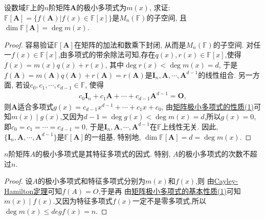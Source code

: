 \documentclass[../../main.tex]{subfiles}%
\begin{document}
\begin{proposition}\label{proposition:F[A]的维数等于A的极小多项式的次数}
设数域\(\mathbb{F}\)上的\(n\)阶矩阵\(\boldsymbol{A}\)的极小多项式为\(m(x)\), 求证: \(\mathbb{F}[\boldsymbol{A}] = \{f(\boldsymbol{A})|f(x)\in\mathbb{F}[x]\}\)是\(M_n(\mathbb{F})\)的子空间, 且\(\dim\mathbb{F}[\boldsymbol{A}] = \deg m(x)\).
\end{proposition}
\begin{proof}

容易验证\(\mathbb{F}[\boldsymbol{A}]\)在矩阵的加法和数乘下封闭, 从而是\(M_n(\mathbb{F})\)的子空间. 对任一\(f(x)\in\mathbb{F}[x]\),由多项式的带余除法可知,存在$q(x),r(x)\in \mathbb{F}[x]$,使得\(f(x) = m(x)q(x) + r(x)\), 其中\(\deg r(x)<\deg m(x) = d\), 于是\(f(\boldsymbol{A}) = m(\boldsymbol{A})q(\boldsymbol{A}) + r(\boldsymbol{A}) = r(\boldsymbol{A})\)是\(\boldsymbol{I}_n,\boldsymbol{A},\cdots,\boldsymbol{A}^{d - 1}\)的线性组合. 另一方面, 若设\(c_0,c_1,\cdots,c_{d - 1}\in\mathbb{F}\), 使得
\begin{align*}
c_0\boldsymbol{I}_n + c_1\boldsymbol{A}+\cdots + c_{d - 1}\boldsymbol{A}^{d - 1} = \boldsymbol{O},
\end{align*}
则\(\boldsymbol{A}\)适合多项式\(g(x) = c_{d - 1}x^{d - 1}+\cdots + c_1x + c_0\), 由\hyperref[proposition:极小多项式的性质]{矩阵极小多项式的性质(1)}可知$m(x)\mid g(x)$,又因为\(d-1=\deg g(x)<\deg m(x) = d\),所以\(g(x) = 0\), 即\(c_0 = c_1 = \cdots = c_{d - 1} = 0\), 于是\(\boldsymbol{I}_n,\boldsymbol{A},\cdots,\boldsymbol{A}^{d - 1}\)在\(\mathbb{F}\)上线性无关. 因此, \(\{\boldsymbol{I}_n,\boldsymbol{A},\cdots,\boldsymbol{A}^{d - 1}\}\)是\(\mathbb{F}[\boldsymbol{A}]\)的一组基, 特别地, \(\dim\mathbb{F}[\boldsymbol{A}] = d = \deg m(x)\). 

\end{proof}

\begin{proposition}\label{proposition:矩阵的极小多项式是其特征多项式的因式}
$n$阶矩阵$A$的极小多项式是其特征多项式的因式. 特别, $A$的极小多项式的次数不超过$n$.
\end{proposition}
\begin{proof}

设$A$的极小多项式和特征多项式分别为$m(x)$和$f(x)$,则
由\hyperref[theorem:Cayley-Hamilton定理]{Cayley-Hamilton定理}可知$f(A)=O$,于是再
由\hyperref[proposition:极小多项式的性质]{矩阵极小多项式的基本性质(1)}可知$m(x)\mid f(x)$.又因为特征多项式$f(x)$一定不是零多项式,所以$\deg m(x)\leqslant  deg f(x)=n$.

\end{proof}
\end{document}
